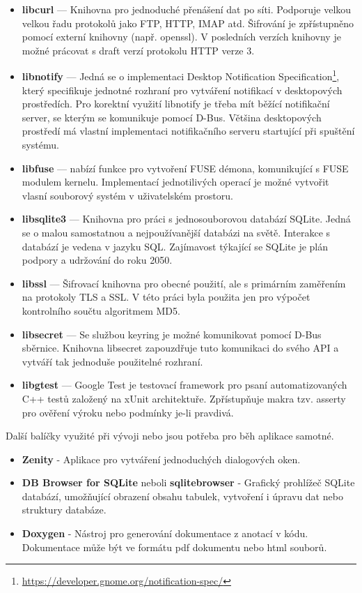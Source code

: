 \begin{itemize}
    \item \textbf{libcurl} — Knihovna pro jednoduché přenášení dat po síti. Podporuje velkou velkou řadu protokolů jako FTP, HTTP, IMAP atd. Šifrování je zpřístupněno pomocí
    externí knihovny (např. openssl). V posledních verzích knihovny je možné prácovat s draft verzí protokolu HTTP verze 3. \cite{libcurl}
    \item \textbf{libnotify} — Jedná se o implementaci Desktop Notification Specification\footnote{\url{https://developer.gnome.org/notification-spec/}}, který specifikuje
    jednotné rozhraní pro vytváření notifikací v desktopových prostředích. Pro korektní využití libnotify je třeba mít běžící notifikační server, se kterým se komunikuje
    pomocí D-Bus. Většina desktopových prostředí má vlastní implementaci notifikačního serveru startující při spuštění systému. \cite{libnotify}
    \item \textbf{libfuse} — nabízí funkce pro vytvoření FUSE démona, komunikující s FUSE modulem kernelu. Implementací jednotilivých operací je možné vytvořit vlasní
    souborový systém v uživatelském prostoru. \cite{libfuse}
    \item \textbf{libsqlite3} — Knihovna pro práci s jednosouborovou databází SQLite. Jedná se o malou samostatnou a nejpoužívanější databázi na světě. Interakce s databází
    je vedena v jazyku SQL. Zajímavost týkající se SQLite je plán podpory a udržování do roku 2050. \cite{libsqlite}
    \item \textbf{libssl} — Šifrovací knihovna pro obecné použití, ale s primárním zaměřením na protokoly TLS a SSL. V této práci byla použita jen pro výpočet kontrolního
    součtu algoritmem MD5. \cite{libssl}
    \item \textbf{libsecret} — Se službou keyring je možné komunikovat pomocí D-Bus sběrnice. Knihovna libsecret zapouzdřuje tuto komunikaci do svého API a vytváří tak
    jednoduše použitelné rozhraní. \cite{libsecret}
    \item \textbf{libgtest} — Google Test je testovací framework pro psaní automatizovaných C++ testů založený na xUnit architektuře. Zpřístupňuje makra tzv. asserty pro
    ověření výroku nebo podmínky je-li pravdivá. \cite{libgtest}
\end{itemize}

\noindent Další balíčky využité při vývoji nebo jsou potřeba pro běh aplikace samotné.

\begin{itemize}
    \item \textbf{Zenity} - Aplikace pro vytváření jednoduchých dialogových oken.
    \item \textbf{DB Browser for SQLite} neboli \textbf{sqlitebrowser} - Grafický prohlížeč SQLite databází, umožňující obrazení obsahu tabulek, vytvoření i úpravu dat
    nebo struktury databáze.
    \item \textbf{Doxygen} - Nástroj pro generování dokumentace z anotací v kódu. Dokumentace může být ve formátu pdf dokumentu nebo html souborů.
\end{itemize}

